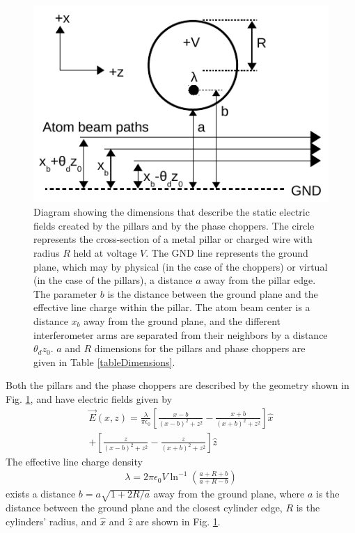 \documentclass[twocolumn,prl,showpacs,superscriptaddress]{revtex4-1}   %
\newcommand{\figref}[1]{Fig. \ref{#1}}
\begin{document}
\begin{figure}
\includegraphics[width=\linewidth,keepaspectratio]{EDiagram1.pdf}
\caption{\label{EDiagram}Diagram showing the dimensions that describe the static electric fields created by the pillars and by the phase choppers. The circle represents the cross-section of a metal pillar or charged wire with radius $R$ held at voltage $V$. The GND line represents the ground plane, which may by physical (in the case of the choppers) or virtual (in the case of the pillars), a distance $a$ away from the pillar edge. The parameter $b$ is the distance between the ground plane and the effective line charge within the pillar. The atom beam center is a distance $x_b$ away from the ground plane, and the different interferometer arms are separated from their neighbors by a distance $\theta_d z_0$. $a$ and $R$ dimensions for the pillars and phase choppers are given in Table \ref{tableDimensions}.}
\end{figure}

Both the pillars and the phase choppers are described by the geometry shown in \figref{EDiagram}, and have electric fields given by
\begin{align}
	\vec{E}(x,z) = \frac{\lambda}{\pi\epsilon_0}
	\left[	
		\frac{x-b}{(x-b)^2+z^2} - \frac{x+b}{(x+b)^2+z^2}
	\right] \hat{x} \nonumber \\
	+ 
	\left[	
		\frac{z}{(x-b)^2+z^2} - \frac{z}{(x+b)^2+z^2}
	\right] \hat{z}
	\label{EPillars}
\end{align}
The effective line charge density
\begin{align}
	\lambda = 2\pi\epsilon_0V\ln^{-1}
	\left(
		\frac{a+R+b}{a+R-b}
	\right)
	\label{lambda}
\end{align}
exists a distance $b = a\sqrt{1+2R/a}$ away from the ground plane, where $a$ is the distance between the ground plane and the closest cylinder edge, $R$ is the cylinders' radius, and $\hat{x}$ and $\hat{z}$ are shown in \figref{EDiagram}.
\end{document}
